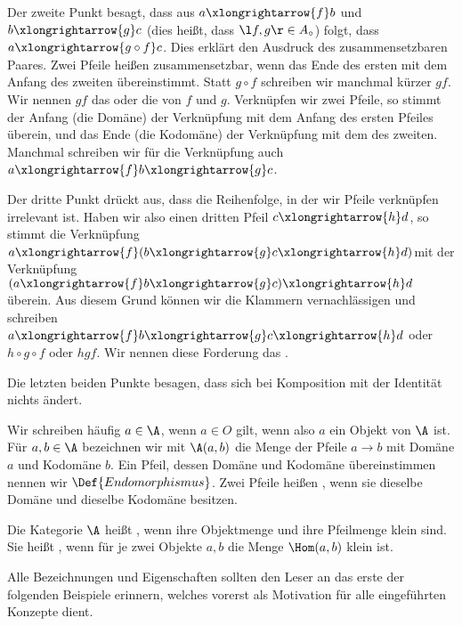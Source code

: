 Der zweite Punkt besagt, dass aus $a\xlongrightarrow{f}b$ und $b\xlongrightarrow{g}c$ (dies heißt, dass $\l f,g\r\in A_\circ$) folgt, dass $a\xlongrightarrow{g\circ f}c$. Dies erklärt den Ausdruck des zusammensetzbaren Paares. Zwei Pfeile heißen zusammensetzbar, wenn das Ende des ersten mit dem Anfang des zweiten übereinstimmt. Statt $g\circ f$ schreiben wir manchmal kürzer $gf$. Wir nennen $gf$ das  oder die  von $f$ und $g$. Verknüpfen wir zwei Pfeile, so stimmt der Anfang (die Domäne) der Verknüpfung mit dem Anfang des ersten Pfeiles überein, und das Ende (die Kodomäne) der Verknüpfung mit dem des zweiten. Manchmal schreiben wir für die Verknüpfung auch $a\xlongrightarrow{f}b\xlongrightarrow{g}c$.

Der dritte Punkt drückt aus, dass die Reihenfolge, in der wir Pfeile verknüpfen irrelevant ist. Haben wir also einen dritten Pfeil $c\xlongrightarrow{h}d$, so stimmt die Verknüpfung $a\xlongrightarrow{f}(b\xlongrightarrow{g}c\xlongrightarrow{h}d)$mit der Verknüpfung $(a\xlongrightarrow{f}b\xlongrightarrow{g}c)\xlongrightarrow{h}d$ überein. Aus diesem Grund können wir die Klammern vernachlässigen und schreiben $a\xlongrightarrow{f}b\xlongrightarrow{g}c\xlongrightarrow{h}d$ oder $h\circ g\circ f$ oder $hgf$. Wir nennen diese Forderung das .

Die letzten beiden Punkte besagen, dass sich bei Komposition mit der Identität nichts ändert.

Wir schreiben häufig $a\in\A$, wenn $a\in O$ gilt, wenn also $a$ ein Objekt von $\A$ ist. Für $a,b\in\A$ bezeichnen wir mit $\A(a,b)$ die Menge der Pfeile $a\longrightarrow b$ mit Domäne $a$ und Kodomäne $b$. Ein Pfeil, dessen Domäne und Kodomäne übereinstimmen nennen wir $\Def{Endomorphismus}$. Zwei Pfeile heißen , wenn sie dieselbe Domäne und dieselbe Kodomäne besitzen.

Die Kategorie $\A$ heißt , wenn ihre Objektmenge und ihre Pfeilmenge klein sind. Sie heißt , wenn für je zwei Objekte $a,b$ die Menge $\Hom(a,b)$ klein ist.

Alle Bezeichnungen und Eigenschaften sollten den Leser an das erste der folgenden Beispiele erinnern, welches vorerst als Motivation für alle eingeführten Konzepte dient.

